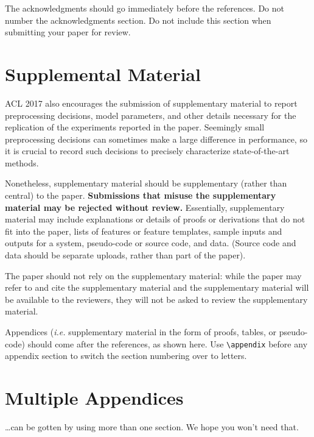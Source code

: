 \documentclass[11pt,a4paper]{article}
\begin{document}
The acknowledgments should go immediately before the references.  Do
not number the acknowledgments section. Do not include this section
when submitting your paper for review.

%
%



\appendix

\section{Supplemental Material}
\label{sec:supplemental}
ACL 2017 also encourages the submission of supplementary material
to report preprocessing decisions, model parameters, and other details
necessary for the replication of the experiments reported in the 
paper. Seemingly small preprocessing decisions can sometimes make
a large difference in performance, so it is crucial to record such
decisions to precisely characterize state-of-the-art methods.

Nonetheless, supplementary material should be supplementary (rather
than central) to the paper. {\bf Submissions that misuse the supplementary 
material may be rejected without review.}
Essentially, supplementary material may include explanations or details
of proofs or derivations that do not fit into the paper, lists of
features or feature templates, sample inputs and outputs for a system,
pseudo-code or source code, and data. (Source code and data should
be separate uploads, rather than part of the paper).

The paper should not rely on the supplementary material: while the paper
may refer to and cite the supplementary material and the supplementary material will be available to the
reviewers, they will not be asked to review the
supplementary material.

Appendices ({\em i.e.} supplementary material in the form of proofs, tables,
or pseudo-code) should come after the references, as shown here. Use
\verb|\appendix| before any appendix section to switch the section
numbering over to letters.

\section{Multiple Appendices}
\dots can be gotten by using more than one section. We hope you won't
need that.
\end{document}
